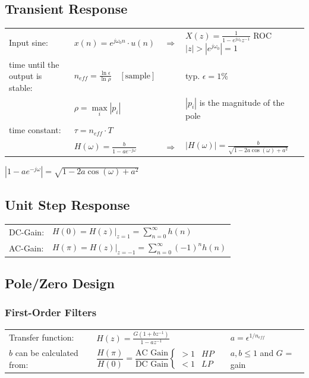 \subsection{Transient Response}
\begin{tabular}{llll}
  Input sine: &
  $x(n) = e^{j \omega_0 n} \cdot u(n)$ &
  $\Rightarrow$ &
  $X(z) = \frac{1}{1-e^{j \omega_0} z^{-1}}$ \qquad
  ROC $|z| > |e^{j\omega_0}|=1$ \\
  
  time until the output is stable: &
  $n_{eff} = \frac{\ln \epsilon}{\ln \rho} \quad [\text{sample}]$ &
  &
  typ. $\epsilon = 1\%$ \\
 
  &
  $\rho = \max\limits_{i}\left|p_i \right| $ &
  &
  $|p_i|$ is the magnitude of the pole\\
  
  time constant: &
  $\tau = n_{eff}\cdot T$ \\
  
  &
  $H(\omega)=\frac{b}{1-ae^{-j\omega}}$ &
  $\Rightarrow$ &
  $\left| H(\omega)\right| = \frac{b}{\sqrt{1-2a\cos(\omega) + a^2}}$ \\
\end{tabular}

$\left| 1-a e^{-j\omega}\right| = \sqrt{1-2a\cos(\omega) + a^2}$\\

\subsection{Unit Step Response}
\begin{tabularx}{1\textwidth}{l X}
	DC-Gain: & $H(0) = H(z)|_{z=1}= \sum\limits_{n=0}^{\infty}h(n) $
	\\
	AC-Gain: & $H(\pi) = H(z)|_{z=-1}= \sum\limits_{n=0}^{\infty}(-1)^n h(n) $
\end{tabularx}


\subsection{Pole/Zero Design}
\subsubsection{First-Order Filters }
  \begin{tabular}{llp{2cm}l}
    Transfer function: &
    $H(z) = \frac{G(1+bz^{-1})}{1-az^{-1}}$ & &
    $a = \epsilon^{1/n_{eff}}$ \\
    $b$ can be calculated from: &
    $\dfrac{H(\pi)}{H(0)} = \dfrac{\text{AC Gain}}{\text{DC Gain}} \left\lbrace \begin{matrix}
      >1 & HP \\
      <1 & LP
    \end{matrix}\right.$ & &
    $a,b \leq 1$ and $G$ = gain
  \end{tabular}

